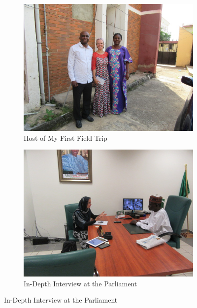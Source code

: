 \newpage
\begin{figure}[H]
\begin{subfigure}{0.485\textwidth}
\includegraphics[width=\linewidth]{Chapter_6/conclusion-figure2.JPG}
\caption{Host of My First Field Trip} \label{fig:a}
\end{subfigure}\hspace*{\fill}
\begin{subfigure}{0.485\textwidth}
\includegraphics[width=\linewidth]{Chapter_6/conclusion-figure6.JPG}
\caption{In-Depth Interview at the Parliament} \label{fig:b}
\end{subfigure}


\end{figure}
